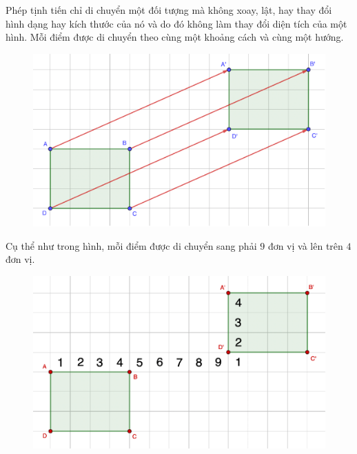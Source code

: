\begin{multicols}{2}
\begin{figure}[H]
		\vspace*{-10pt}
	\end{figure}
	Phép tịnh tiến chỉ di chuyển một đối tượng mà không xoay, lật, hay thay đổi hình dạng hay kích thước của nó và do đó không làm thay đổi diện tích của một hình. Mỗi điểm được di chuyển theo cùng một khoảng cách và cùng một hướng. 
	\begin{figure}[H]
		\vspace*{-5pt}
		\centering
		\captionsetup{labelformat= empty, justification=centering}
		\includegraphics[width= 1\linewidth]{Picture31}
		\vspace*{-10pt}
	\end{figure}
	Cụ thể như trong hình, mỗi điểm được di chuyển sang phải $9$ đơn vị và lên trên $4$ đơn vị. 
	\begin{figure}[H]
		\vspace*{-5pt}
		\centering
		\captionsetup{labelformat= empty, justification=centering}
		\includegraphics[width= 1\linewidth]{Picture32}
		\vspace*{-10pt}
	\end{figure}

\end{multicols}
